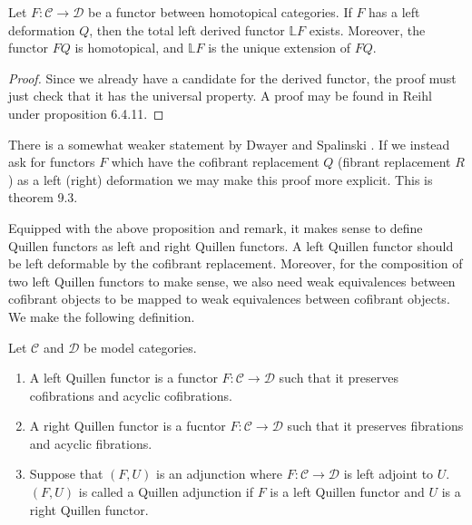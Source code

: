 \documentclass[../thesis.tex]{subfiles}
\begin{document}
            \begin{proposition}
                Let $F:\mathcal{C}\rightarrow\mathcal{D}$ be a functor between homotopical categories. If $F$ has a left deformation $Q$, then the total left derived functor $\mathbb{L}F$ exists. Moreover, the functor $FQ$ is homotopical, and $\mathbb{L}F$ is the unique extension of $FQ$.
            \end{proposition}

            \begin{proof}
                Since we already have a candidate for the derived functor, the proof must just check that it has the universal property. A proof may be found in Reihl \cite{Riehl16} under proposition 6.4.11.
            \end{proof}

            \begin{remark}
                There is a somewhat weaker statement by Dwayer and Spalinski \cite{Dwyer95}. If we instead ask for functors $F$ which have the cofibrant replacement $Q$ (fibrant replacement $R$) as a left (right) deformation we may make this proof more explicit. This is theorem 9.3.
            \end{remark}

            Equipped with the above proposition and remark, it makes sense to define Quillen functors as left and right Quillen functors. A left Quillen functor should be left deformable by the cofibrant replacement. Moreover, for the composition of two left Quillen functors to make sense, we also need weak equivalences between cofibrant objects to be mapped to weak equivalences between cofibrant objects. We make the following definition.

            \begin{definition}
                Let $\mathcal{C}$ and $\mathcal{D}$ be model categories. \begin{enumerate}
                    \item A left Quillen functor is a functor $F:\mathcal{C}\rightarrow\mathcal{D}$ such that it preserves cofibrations and acyclic cofibrations.
                    \item A right Quillen functor is a fucntor $F:\mathcal{C}\rightarrow\mathcal{D}$ such that it preserves fibrations and acyclic fibrations.
                    \item Suppose that $(F,U)$ is an adjunction where $F:\mathcal{C}\rightarrow\mathcal{D}$ is left adjoint to $U$. $(F,U)$ is called a Quillen adjunction if $F$ is a left Quillen functor and $U$ is a right Quillen functor.
                \end{enumerate}
            \end{definition}
\end{document}
